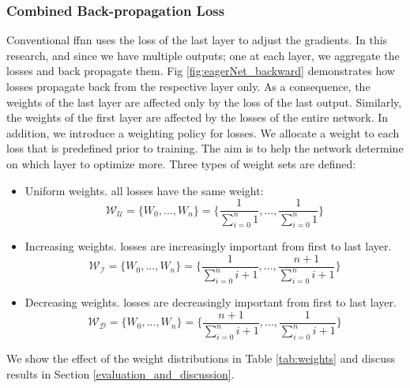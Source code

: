 \documentclass[conference]{IEEEtran}
\begin{document}
\subsubsection{Combined Back-propagation Loss}
Conventional \gls{ffnn} uses the loss of the last layer to adjust the gradients. In this research, and since we have multiple outputs; one at each layer, we aggregate the losses and back propagate them. Fig \ref{fig:eagerNet_backward} demonstrates how losses propagate back from the respective layer only. As a consequence, the weights of the last layer are affected only by the loss of the last output. Similarly, the weights of the first layer are affected by the losses of the entire network. In addition, we introduce a weighting policy for losses. We allocate a weight to each loss that is predefined prior to training. The aim is to help the network determine on which layer to optimize more. Three types of weight sets are defined:
\begin{itemize}
\item Uniform weights. all losses have the same weight:
\begin{equation}
\mathcal{W_U} = \lbrace W_{0}, ..., W_{n} \rbrace = \lbrace \frac{1}{\sum_{i=0}^{n} 1}, ..., \frac{1}{\sum_{i=0}^{n} 1} \rbrace
\end{equation}

\item Increasing weights. losses are increasingly important from first to last layer.
\begin{equation}
\mathcal{W_I} = \lbrace W_{0}, ..., W_{n} \rbrace = \lbrace \frac{1}{\sum_{i=0}^{n} i+1}, ..., \frac{n+1}{\sum_{i=0}^{n} i+1} \rbrace
\end{equation}

\item Decreasing weights. losses are decreasingly important from first to last layer.
\begin{equation}
\mathcal{W_D} = \lbrace W_{0}, ..., W_{n} \rbrace = \lbrace \frac{n+1}{\sum_{i=0}^{n} i+1}, ..., \frac{1}{\sum_{i=0}^{n} i+1} \rbrace
\end{equation}

\end{itemize}

We show the effect of the weight distributions in Table \ref{tab:weights} and discuss results in Section \ref{evaluation_and_discussion}.

\end{document}
